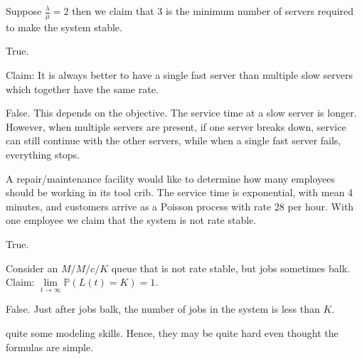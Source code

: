 \documentclass[stochastic-or.tex]{subfiles}
\begin{document}
\begin{truefalse}
    Suppose $\frac{\lambda}{\mu} = 2$ then we claim that 3 is the minimum number of servers required to make the system stable.
    \begin{solution}
        True.
    \end{solution}
\end{truefalse}

\begin{truefalse}
Claim: It is always better to have a single fast server than multiple slow servers which together have the same rate.
    \begin{solution}
    False.
This depends on the objective.
The service time at a slow server is longer.
However, when multiple servers are present, if one server breaks down, service can still continue with the other servers, while when a single fast server fails, everything stops.
    \end{solution}
\end{truefalse}

\begin{truefalse}
A repair/maintenance facility would like to determine how many employees should be working in its tool crib.
The service time is exponential, with mean 4 minutes, and customers arrive as a Poisson process with rate 28 per hour.
With one employee we claim that the system is not rate stable.
\begin{solution}
True.
\end{solution}
\end{truefalse}


\begin{truefalse}
Consider an $M/M/c/K$ queue that is not rate stable, but  jobs sometimes balk. Claim: $\lim\limits_{t\to\infty}\mathbb{P}(L(t)=K)=1$.
\begin{solution}
  False. Just after jobs balk, the number of jobs in the system is less than $K$.
\end{solution}
\end{truefalse}



 quite some modeling skills. Hence, they may be quite hard even thought the formulas are simple.
\end{document}
